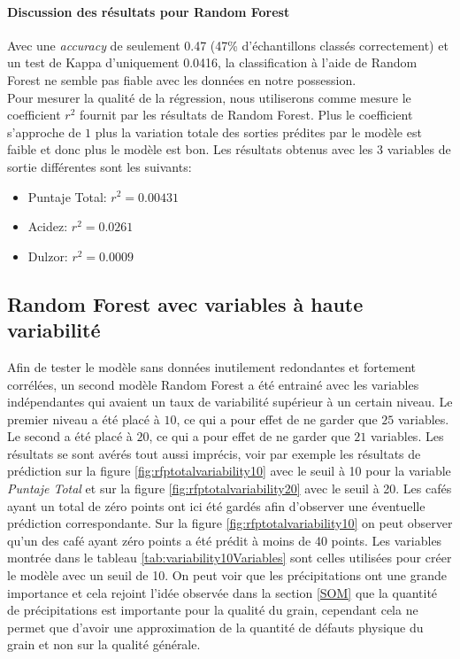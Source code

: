 \newpage


\paragraph{Discussion des résultats pour Random Forest}
Avec une \textit{accuracy} de seulement 0.47  (47\% d'échantillons classés correctement) et un test de Kappa d'uniquement 0.0416, la classification à l'aide de Random Forest ne semble pas fiable avec les données en notre possession. \\

\noindent Pour mesurer la qualité de la régression, nous utiliserons comme mesure le coefficient $r^2$ fournit par les résultats de Random Forest. Plus le coefficient s'approche de $1$ plus la variation totale des sorties prédites par le modèle est faible et donc plus le modèle est bon. Les résultats obtenus avec les 3 variables de sortie différentes sont les suivants: \\


\begin{itemize}
	\item Puntaje Total: $r^2 = 0.00431$
	\item Acidez: $r^2 = 0.0261$
	\item Dulzor: $r^2 = 0.0009$
\end{itemize} 












\subsection{Random Forest avec variables à haute variabilité}
Afin de tester le modèle sans données inutilement redondantes et fortement corrélées, un second modèle Random Forest a été entrainé avec les variables indépendantes qui avaient un taux de variabilité supérieur à un certain niveau. Le premier niveau a été placé à $10$, ce qui a pour effet de ne garder que $25$ variables. Le second a été placé à $20$, ce qui a pour effet de ne garder que $21$ variables. Les résultats se sont avérés tout aussi imprécis, voir par exemple les résultats de prédiction sur la figure \ref{fig:rfptotalvariability10} avec le seuil à 10 pour la variable \textit{Puntaje Total} et sur la figure \ref{fig:rfptotalvariability20} avec le seuil à 20. Les cafés ayant un total de zéro points ont ici été gardés afin d'observer une éventuelle prédiction correspondante. Sur la figure \ref{fig:rfptotalvariability10} on peut observer qu'un des café ayant zéro points a été prédit à moins de 40 points. Les variables montrée dans le tableau \ref{tab:variability10Variables} sont celles utilisées pour créer le modèle avec un seuil de 10. On peut voir que les précipitations ont une grande importance et cela rejoint l'idée observée dans la section \ref{SOM} que la quantité de précipitations est importante pour la qualité du grain, cependant cela ne permet que d'avoir une approximation de la quantité de défauts physique du grain et non sur la qualité générale. 

